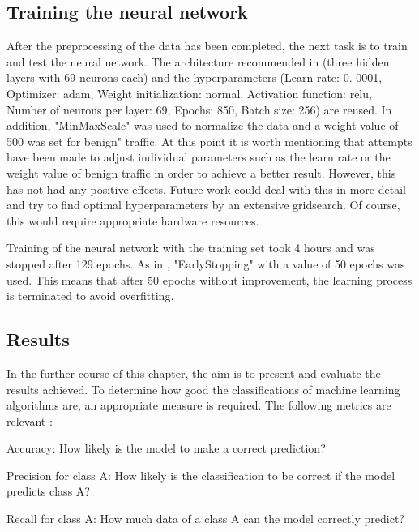\documentclass[conference]{IEEEtran}
\begin{document}
\subsection{Training the neural network}
After the preprocessing of the data has been completed, the next task is to train and test the neural network. The architecture recommended in \cite{max1} (three hidden layers with 69 neurons each) and the hyperparameters (Learn rate: 0. 0001, Optimizer: adam, Weight initialization: normal, Activation function: relu, Number of neurons per layer: 69, Epochs: 850, Batch size: 256) are reused. In addition, "MinMaxScale" was used to normalize the data and a weight value of 500 was set for benign" traffic. At this point it is worth mentioning that attempts have been made to adjust individual parameters such as the learn rate or the weight value of benign traffic in order to achieve a better result. However, this has not had any positive effects. Future work could deal with this in more detail and try to find optimal hyperparameters by an extensive gridsearch. Of course, this would require appropriate hardware resources.

\smallskip
Training of the neural network with the training set took 4 hours and was stopped after 129 epochs. As in \cite{max1}, "EarlyStopping" with a value of 50 epochs was used. This means that after 50 epochs without improvement, the learning process is terminated to avoid overfitting.

\subsection{Results}
In the further course of this chapter, the aim is to present and evaluate the results achieved. To determine how good the classifications of machine learning algorithms are, an appropriate measure is required. The following metrics are relevant \cite{max3}:
\smallskip 

Accuracy: How likely is the model to make a correct prediction?
\smallskip

Precision for class A: How likely is the classification to be correct if the model predicts class A?
\smallskip

Recall for class A: How much data of a class A can the model correctly predict?
\smallskip
\end{document}
